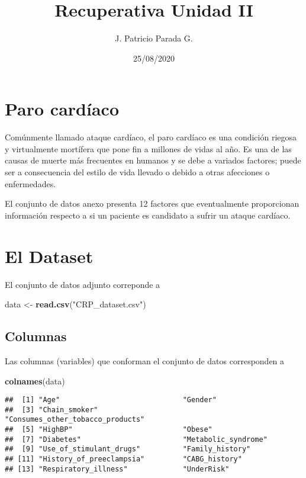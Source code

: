 \documentclass[
  spanish,
]{article}
\title{Recuperativa Unidad II}
\author{J. Patricio Parada G.}
\date{25/08/2020}
\newenvironment{Shaded}{\begin{snugshade}}{\end{snugshade}}
\newcommand{\KeywordTok}[1]{\textcolor[rgb]{0.13,0.29,0.53}{\textbf{#1}}}
\newcommand{\NormalTok}[1]{#1}
\newcommand{\StringTok}[1]{\textcolor[rgb]{0.31,0.60,0.02}{#1}}
\begin{document}
\maketitle

{
\setcounter{tocdepth}{2}
\tableofcontents
}
\hypertarget{paro-carduxedaco}{%
\section{Paro cardíaco}\label{paro-carduxedaco}}

Comúnmente llamado ataque cardíaco, el paro cardíaco es una condición
riegosa y virtualmente mortífera que pone fin a millones de vidas al
año. Es una de las causas de muerte más frecuentes en humanos y se debe
a variados factores; puede ser a consecuencia del estilo de vida llevado
o debido a otras afecciones o enfermedades.

El conjunto de datos anexo presenta 12 factores que eventualmente
proporcionan información respecto a si un paciente es candidato a sufrir
un ataque cardíaco.

\hypertarget{el-dataset}{%
\section{El Dataset}\label{el-dataset}}

El conjunto de datos adjunto correponde a

\begin{Shaded}
\begin{Highlighting}[]
\NormalTok{data \textless{}{-}}\StringTok{ }\KeywordTok{read.csv}\NormalTok{(}\StringTok{"CRP\_dataset.csv"}\NormalTok{)}
\end{Highlighting}
\end{Shaded}

\hypertarget{columnas}{%
\subsection{Columnas}\label{columnas}}

Las columnas (variables) que conforman el conjunto de datos corresponden
a

\begin{Shaded}
\begin{Highlighting}[]
\KeywordTok{colnames}\NormalTok{(data)}
\end{Highlighting}
\end{Shaded}

\begin{verbatim}
##  [1] "Age"                             "Gender"                         
##  [3] "Chain_smoker"                    "Consumes_other_tobacco_products"
##  [5] "HighBP"                          "Obese"                          
##  [7] "Diabetes"                        "Metabolic_syndrome"             
##  [9] "Use_of_stimulant_drugs"          "Family_history"                 
## [11] "History_of_preeclampsia"         "CABG_history"                   
## [13] "Respiratory_illness"             "UnderRisk"
\end{verbatim}
\end{document}
